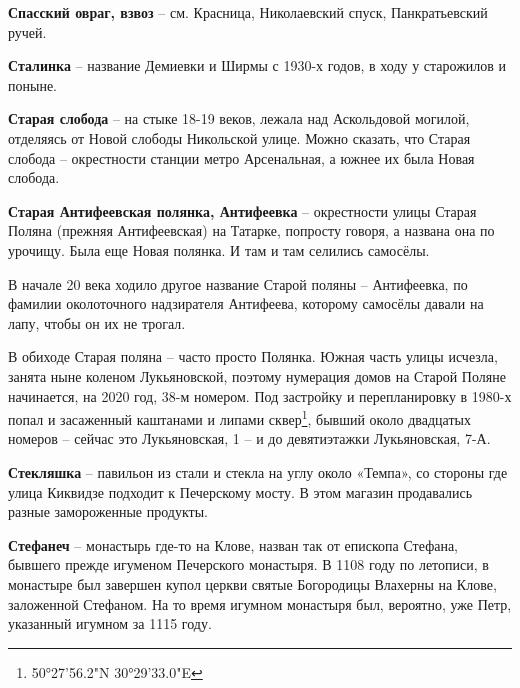\textbf{Спасский овраг, взвоз} – см. Красница, Николаевский спуск, Панкратьевский ручей.\\

\medskip

\textbf{Сталинка} – название Демиевки и Ширмы с 1930-х годов, в ходу у старожилов и поныне.\\

\medskip


\textbf{Старая слобода} – на стыке 18-19 веков, лежала над Аскольдовой могилой, отделяясь от Новой слободы Никольской улице. Можно сказать, что Старая слобода – окрестности станции метро Арсенальная, а южнее их была Новая слобода.\\

\medskip

\textbf{Старая Антифеевская полянка, Антифеевка} – окрестности улицы Старая Поляна (прежняя Антифеевская) на Татарке, попросту говоря, а названа она по урочищу. Была еще Новая полянка. И там и там селились самосёлы. 

В начале 20 века ходило другое название Старой поляны – Антифеевка, по фамилии околоточного надзирателя Антифеева, которому самосёлы давали на лапу, чтобы он их не трогал. 

В обиходе Старая поляна – часто просто Полянка. Южная часть улицы исчезла, занята ныне коленом Лукьяновской, поэтому нумерация домов на Старой Поляне начинается, на 2020 год, 38-м номером. Под застройку и перепланировку в 1980-х попал и засаженный каштанами и липами сквер\footnote{50°27'56.2"N 30°29'33.0"E}, бывший около двадцатых номеров – сейчас это Лукьяновская, 1 – и до девятиэтажки Лукьяновская, 7-А.\\

\medskip



\textbf{Стекляшка} – павильон из стали и стекла на углу около «Темпа», со стороны где улица Киквидзе подходит к Печерскому мосту. В этом магазин продавались разные замороженные продукты.\\

\medskip

\textbf{Стефанеч} – монастырь где-то на Клове, назван так от епископа Стефана, бывшего прежде игуменом Печерского монастыря. В 1108 году по летописи, в монастыре был завершен купол церкви святые Богородицы Влахерны на Клове, заложенной Стефаном. На то время игумном монастыря был, вероятно, уже Петр, указанный игумном за 1115 году.\\

